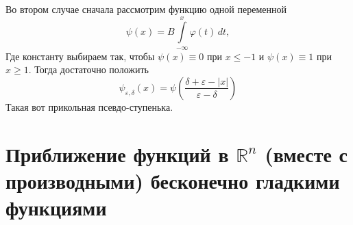 \documentclass[a4paper,12pt]{article} %
\theoremstyle{definition}
\begin{document}
Во втором случае сначала рассмотрим функцию одной переменной
\begin{equation}
	\psi (x) = B \int\limits_{-\infty}^{x} \varphi (t) \, dt,
\end{equation}
Где константу выбираем так, чтобы $\psi (x) \equiv 0$ при $x \leq  -1$ и $\psi (x) \equiv 1$ при $x \geq  1$. Тогда достаточно положить 
\begin{equation}
	\psi_{\varepsilon, \delta} (x) = \psi \left( \frac{\delta + \varepsilon - |x|}{\varepsilon - \delta}\right)
\end{equation}
Такая вот прикольная псевдо-ступенька.
\section{Приближение функций в $\mathbb{R}^n$ (вместе с производными) бесконечно гладкими функциями}
\end{document}
